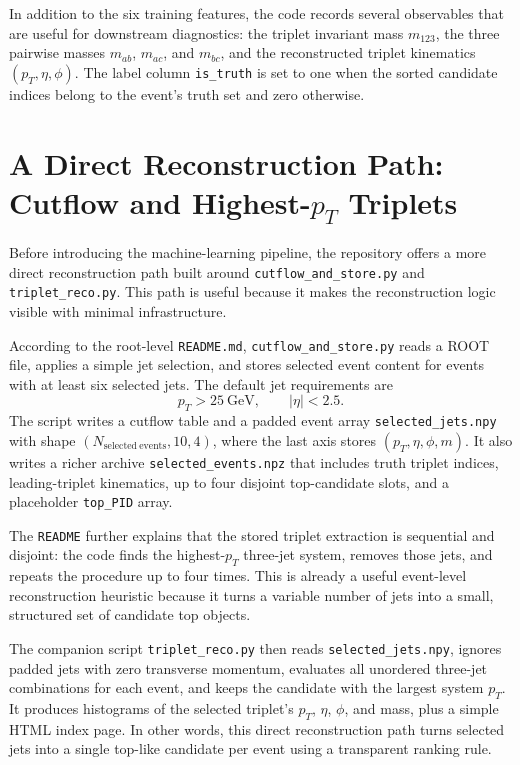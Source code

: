 \documentclass[11pt]{article}
\begin{document}
In addition to the six training features, the code records several observables that are useful for downstream diagnostics: the triplet invariant mass $m_{123}$, the three pairwise masses $m_{ab}$, $m_{ac}$, and $m_{bc}$, and the reconstructed triplet kinematics $(p_T,\eta,\phi)$. The label column \texttt{is\_truth} is set to one when the sorted candidate indices belong to the event's truth set and zero otherwise.

\section{A Direct Reconstruction Path: Cutflow and Highest-$p_T$ Triplets}

Before introducing the machine-learning pipeline, the repository offers a more direct reconstruction path built around \texttt{cutflow\_and\_store.py} and \texttt{triplet\_reco.py}. This path is useful because it makes the reconstruction logic visible with minimal infrastructure.

According to the root-level \texttt{README.md}, \texttt{cutflow\_and\_store.py} reads a ROOT file, applies a simple jet selection, and stores selected event content for events with at least six selected jets. The default jet requirements are
\[
p_T > 25~\mathrm{GeV}, \qquad |\eta| < 2.5.
\]
The script writes a cutflow table and a padded event array \texttt{selected\_jets.npy} with shape $(N_{\mathrm{selected\ events}}, 10, 4)$, where the last axis stores $(p_T,\eta,\phi,m)$. It also writes a richer archive \texttt{selected\_events.npz} that includes truth triplet indices, leading-triplet kinematics, up to four disjoint top-candidate slots, and a placeholder \texttt{top\_PID} array.

The \texttt{README} further explains that the stored triplet extraction is sequential and disjoint: the code finds the highest-$p_T$ three-jet system, removes those jets, and repeats the procedure up to four times. This is already a useful event-level reconstruction heuristic because it turns a variable number of jets into a small, structured set of candidate top objects.

The companion script \texttt{triplet\_reco.py} then reads \texttt{selected\_jets.npy}, ignores padded jets with zero transverse momentum, evaluates all unordered three-jet combinations for each event, and keeps the candidate with the largest system $p_T$. It produces histograms of the selected triplet's $p_T$, $\eta$, $\phi$, and mass, plus a simple HTML index page. In other words, this direct reconstruction path turns selected jets into a single top-like candidate per event using a transparent ranking rule.
\end{document}
